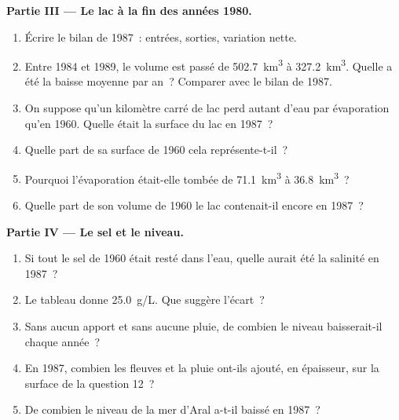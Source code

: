 \begin{problem}
\medskip
\noindent\textbf{Partie III --- Le lac à la fin des années 1980.}
\begin{enumerate}[resume]
  \item Écrire le bilan de 1987~: entrées, sorties, variation nette.
  \item Entre 1984 et 1989, le volume est passé de \qty{502.7}{km^3} à
        \qty{327.2}{km^3}. Quelle a été la baisse moyenne par an~?
        Comparer avec le bilan de 1987.
  \item On suppose qu'un kilomètre carré de lac perd autant d'eau par
        évaporation qu'en 1960. Quelle était la surface du lac en 1987~?
  \item Quelle part de sa surface de 1960 cela représente-t-il~?
  \item Pourquoi l'évaporation était-elle tombée de \qty{71.1}{km^3} à
        \qty{36.8}{km^3}~?
  \item Quelle part de son volume de 1960 le lac contenait-il encore en
        1987~?
\end{enumerate}

\medskip
\noindent\textbf{Partie IV --- Le sel et le niveau.}
\begin{enumerate}[resume]
  \item Si tout le sel de 1960 était resté dans l'eau, quelle aurait été la
        salinité en 1987~?
  \item Le tableau donne \qty{25.0}{g/L}. Que suggère l'écart~?
  \item Sans aucun apport et sans aucune pluie, de combien le niveau
        baisserait-il chaque année~?
  \item En 1987, combien les fleuves et la pluie ont-ils ajouté, en
        épaisseur, sur la surface de la question 12~?
  \item De combien le niveau de la mer d'Aral a-t-il baissé en 1987~?
\end{enumerate}
\end{problem}
